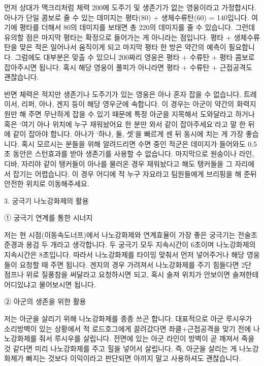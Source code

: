  

먼저 상대가 맥크리처럼 체력 200에 도주기 및 생존기가 없는 영웅이라고 가정합시다. 아나가 단일 콤보로 줄 수 있는 데미지는 평타(80) + 생체수류탄(60) = 140입니다. 여기에 평타를 더해서 80의 데미지를 보태면 총 220의 데미지를 줄 수 있습니다. 그런데 유의할 점은 마지막 평타는 확정으로 들어가는 게 아니라는 점입니다. 평타 + 생체수류탄을 맞은 적은 일어나서 움직이게 되고 마지막 평타 한 방은 약간의 예측이 필요합니다. 그럼에도 대부분은 맞출 수 있으니 200짜리 영웅은 평타 + 수류탄 + 평타 콤보로 잡아주시면 됩니다. 혹시 해당 영웅이 풀피가 아니라면 평타 + 수류탄 + 근접공격도 괜찮습니다.

 

반면 체력은 적지만 생존기나 도주기가 있는 영웅은 아나 혼자 잡을 수 없습니다. 트레이서, 리퍼, 아나, 겐지 등이 해당 영우군에 속합니다. 이 경우는 아군이 약간의 화력지원만 해 주면 무난하게 잡을 수 있기 때문에 특정 아군을 지목해서 도와달라고 하거나 혹은 ‘여기 아나 위치에 누구 재워놨어요 한 분만 와서 같이 잡아주세요’라고 말 한 뒤에 같이 잡아야 합니다. 아나가 ‘하나, 둘, 셋’을 빠르게 센 뒤 동시에 치는 게 가장 좋습니다. 혹시 모르시는 분들을 위해 알려드리면 수면 중인 적군은 데미지가 들어와도 0.5초 동안은 스턴효과를 받아 생존기를 사용할 수 없습니다. 마지막으로 원숭이나 라인, 디바, 자리야 같이 탱커들이 아나를 물러온 경우 재워놨다고 해도 탱커들을 그 자리에서 잡기는 어렵습니다. 이 경우 어디에 적 누구 자요라고 팀원들에게 브리핑을 해 준뒤 안전한 위치로 이동해주세요.


 


3. 궁극기 나노강화제의 활용

 

① 궁극기 연계를 통한 시너지

저는 현 시점(이동속도너프)에서 나노강화제와 연계효율이 가장 좋은 궁극기는 전술조준경과 용검 두 개라고 생각합니다. 두 궁극기 모두 지속시간이 6초이며 나노강화제의 지속시간은 8초입니다. 따라서 나노강화제를 타이밍 맞춰서 먼저 넣어주거나 해당 영웅들이 요청할 때 주면 됩니다. 겐지의 경우 가려져서 나노강화제를 주기 힘들다면 2단 점프나 위로 질풍참을 써달라고 요청하시면 되고, 혹시 솔져 위치가 안보이면 솔져한테 어디있냐고 물어보시면 됩니다.

 

② 아군의 생존을 위한 활용

저는 아군을 살리기 위해 나노강화제를 종종 쓰곤 합니다. 대표적으로 아군 루시우가 소리방벽이 있는 상황에서 적 로드호그에게 끌려갔다면 좌클+근접공격을 맞기 전에 나노강화제를 줘서 루시우를 살립니다. 전면에 있는 아군 라인이 방벽이 곧 깨져서 죽을 것 같다면 미리 나노강화제를 주고 힐을 넣어서 살립니다. 즉, 아군을 살리는 게 나노강화제가 빠지는 것보다 이익이라고 판단되면 아끼지 말고 사용하셔도 괜찮습니다.

